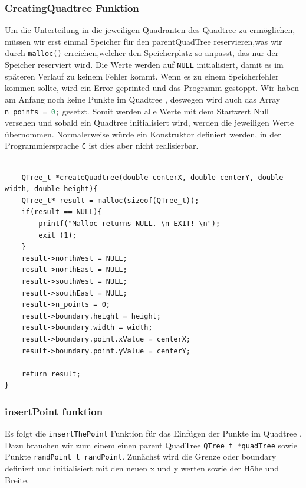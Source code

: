 \documentclass[11pt]{article}
\newcommand{\qt}{Quadtree }
\newcommand{\lstin}[1]{\lstinline[language=C]{#1}}
\begin{document}
\subsubsection{CreatingQuadtree Funktion}
Um die Unterteilung in die jeweiligen Quadranten des \qt zu ermöglichen, müssen wir erst einmal Speicher für den parentQuadTree reservieren,was wir durch \lstin{malloc()} erreichen,welcher den Speicherplatz so anpasst, das nur der Speicher reserviert wird. 
Die Werte werden auf \lstin{NULL} initialisiert, damit es im späteren Verlauf zu keinem Fehler kommt. 
Wenn es zu einem Speicherfehler kommen sollte, wird ein Error geprinted und das Programm gestoppt. 
Wir haben am Anfang noch keine Punkte im \qt, deswegen wird auch das Array \lstin{n_points = 0;} gesetzt. 
Somit werden alle Werte mit dem Startwert Null versehen und sobald ein \qt initialisiert wird, werden die jeweiligen Werte übernommen. Normalerweise würde ein Konstruktor definiert werden, in der Programmiersprache \lstin{C} ist dies aber nicht realisierbar.

\begin{lstlisting}

    QTree_t *createQuadtree(double centerX, double centerY, double width, double height){
    QTree_t* result = malloc(sizeof(QTree_t));
    if(result == NULL){
        printf("Malloc returns NULL. \n EXIT! \n");
        exit (1); 
    }
    result->northWest = NULL;               
    result->northEast = NULL; 
    result->southWest = NULL; 
    result->southEast = NULL;
    result->n_points = 0; 
    result->boundary.height = height; 
    result->boundary.width = width; 
    result->boundary.point.xValue = centerX; 
    result->boundary.point.yValue = centerY; 

    return result; 
}
\end{lstlisting}

\subsubsection{insertPoint funktion}

Es folgt die \lstin{insertThePoint} Funktion für das Einfügen der Punkte im \qt. Dazu brauchen wir zum einem einen parent QuadTree \lstin{QTree_t *quadTree} sowie Punkte \lstin{randPoint_t randPoint}.\newline
Zunächst wird die Grenze oder boundary definiert und initialisiert mit den neuen x und y werten sowie der Höhe und Breite.
\end{document}
